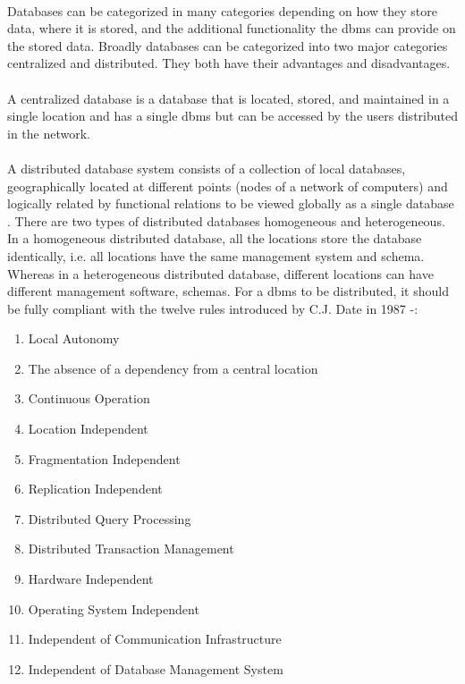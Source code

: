 \documentclass[12pt]{article}
\begin{document}
        \paragraph{}
        Databases can be categorized in many categories depending on how they store data, where it is stored, and the additional functionality the \acrshort{dbms} can provide on the stored data. Broadly databases can be categorized into two major categories centralized and distributed. They both have their advantages and disadvantages.
        \paragraph{}
        A centralized database is a database that is located, stored, and maintained in a single location and has a single \acrshort{dbms} but can be accessed by the users distributed in the network.
        \paragraph{}
        A distributed database system consists of a collection of local databases,  geographically located at different points (nodes of a network of computers) and  logically related by functional relations to be viewed globally as a single database \cite{distributeddatabase}.
        There are two types of distributed databases homogeneous and heterogeneous. In a homogeneous distributed database, all the locations store the database identically, i.e. all locations have the same management system and schema. Whereas in a heterogeneous distributed database, different locations can have different management software, schemas.
        For a \acrshort{dbms} to be distributed, it should be fully compliant with the twelve rules introduced by C.J. Date in 1987 \cite{distributeddbms} -:
        \begin{enumerate}
            \item Local Autonomy
            \item The absence of a dependency from a central location
            \item Continuous Operation
            \item Location Independent
            \item Fragmentation Independent
            \item Replication  Independent
            \item Distributed Query Processing
            \item Distributed Transaction Management
            \item Hardware Independent
            \item Operating System Independent
            \item Independent of Communication  Infrastructure
            \item Independent of Database Management System
        \end{enumerate}
        
\end{document}
